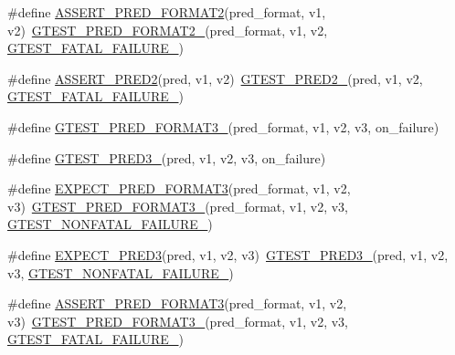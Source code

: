 \begin{DoxyCompactItemize}
\item 
\#define \hyperlink{fused-src_2gtest_2gtest_8h_ac452685a1a98ea3d96eb956a062ee210}{\-A\-S\-S\-E\-R\-T\-\_\-\-P\-R\-E\-D\-\_\-\-F\-O\-R\-M\-A\-T2}(pred\-\_\-format, v1, v2)~\hyperlink{gtest__pred__impl_8h_a115c18d1f752b7f091d577fb69cac372}{\-G\-T\-E\-S\-T\-\_\-\-P\-R\-E\-D\-\_\-\-F\-O\-R\-M\-A\-T2\-\_\-}(pred\-\_\-format, v1, v2, \hyperlink{gtest-internal_8h_a0f9a4c3ea82cc7bf4478eaffdc168358}{\-G\-T\-E\-S\-T\-\_\-\-F\-A\-T\-A\-L\-\_\-\-F\-A\-I\-L\-U\-R\-E\-\_\-})
\item 
\#define \hyperlink{fused-src_2gtest_2gtest_8h_a4e9b777cce4e5423f4c2e491be7aa818}{\-A\-S\-S\-E\-R\-T\-\_\-\-P\-R\-E\-D2}(pred, v1, v2)~\hyperlink{gtest__pred__impl_8h_ac560264104bd030b64034505d294a7b6}{\-G\-T\-E\-S\-T\-\_\-\-P\-R\-E\-D2\-\_\-}(pred, v1, v2, \hyperlink{gtest-internal_8h_a0f9a4c3ea82cc7bf4478eaffdc168358}{\-G\-T\-E\-S\-T\-\_\-\-F\-A\-T\-A\-L\-\_\-\-F\-A\-I\-L\-U\-R\-E\-\_\-})
\item 
\#define \hyperlink{fused-src_2gtest_2gtest_8h_a49cdf8707268ee932bb772d879a226cc}{\-G\-T\-E\-S\-T\-\_\-\-P\-R\-E\-D\-\_\-\-F\-O\-R\-M\-A\-T3\-\_\-}(pred\-\_\-format, v1, v2, v3, on\-\_\-failure)
\item 
\#define \hyperlink{fused-src_2gtest_2gtest_8h_af30518f03233bc4486b55284b0827eb8}{\-G\-T\-E\-S\-T\-\_\-\-P\-R\-E\-D3\-\_\-}(pred, v1, v2, v3, on\-\_\-failure)
\item 
\#define \hyperlink{fused-src_2gtest_2gtest_8h_a7285708fa5d37d6d8ed5b5e59da08bae}{\-E\-X\-P\-E\-C\-T\-\_\-\-P\-R\-E\-D\-\_\-\-F\-O\-R\-M\-A\-T3}(pred\-\_\-format, v1, v2, v3)~\hyperlink{gtest__pred__impl_8h_a49cdf8707268ee932bb772d879a226cc}{\-G\-T\-E\-S\-T\-\_\-\-P\-R\-E\-D\-\_\-\-F\-O\-R\-M\-A\-T3\-\_\-}(pred\-\_\-format, v1, v2, v3, \hyperlink{gtest-internal_8h_a6cb7482cfa03661a91c698eb5895f642}{\-G\-T\-E\-S\-T\-\_\-\-N\-O\-N\-F\-A\-T\-A\-L\-\_\-\-F\-A\-I\-L\-U\-R\-E\-\_\-})
\item 
\#define \hyperlink{fused-src_2gtest_2gtest_8h_a0a0aff2564ea84c7eb3517ac8eda04da}{\-E\-X\-P\-E\-C\-T\-\_\-\-P\-R\-E\-D3}(pred, v1, v2, v3)~\hyperlink{gtest__pred__impl_8h_af30518f03233bc4486b55284b0827eb8}{\-G\-T\-E\-S\-T\-\_\-\-P\-R\-E\-D3\-\_\-}(pred, v1, v2, v3, \hyperlink{gtest-internal_8h_a6cb7482cfa03661a91c698eb5895f642}{\-G\-T\-E\-S\-T\-\_\-\-N\-O\-N\-F\-A\-T\-A\-L\-\_\-\-F\-A\-I\-L\-U\-R\-E\-\_\-})
\item 
\#define \hyperlink{fused-src_2gtest_2gtest_8h_a494e3b8dc22f4765f7e041f16c930e3d}{\-A\-S\-S\-E\-R\-T\-\_\-\-P\-R\-E\-D\-\_\-\-F\-O\-R\-M\-A\-T3}(pred\-\_\-format, v1, v2, v3)~\hyperlink{gtest__pred__impl_8h_a49cdf8707268ee932bb772d879a226cc}{\-G\-T\-E\-S\-T\-\_\-\-P\-R\-E\-D\-\_\-\-F\-O\-R\-M\-A\-T3\-\_\-}(pred\-\_\-format, v1, v2, v3, \hyperlink{gtest-internal_8h_a0f9a4c3ea82cc7bf4478eaffdc168358}{\-G\-T\-E\-S\-T\-\_\-\-F\-A\-T\-A\-L\-\_\-\-F\-A\-I\-L\-U\-R\-E\-\_\-})

\end{DoxyCompactItemize}
